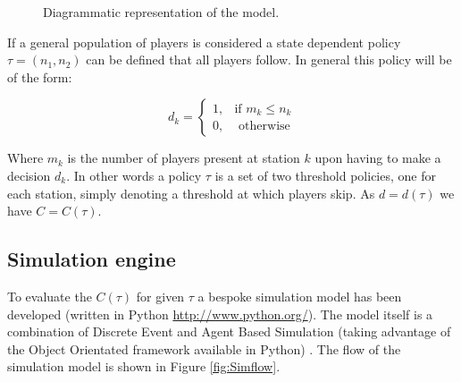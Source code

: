 \documentclass[12pt]{article}
\begin{document}
\begin{figure}[!hpbt]
\begin{center}
    \end{center}

    \caption{Diagrammatic representation of the model.}
	\label{game_pic}

\end{figure}

If a general population of players is considered a state dependent policy $\tau = (n_1, n_2)$ can be defined that all players follow.
In general this policy will be of the form:

$$d_k = \begin{cases}
1,& \text{if }m_k\leq n_k\\
0,&\text{ otherwise}
\end{cases}$$

Where $m_k$ is the number of players present at station $k$ upon having to make a decision $d_k$.
In other words a policy $\tau$ is a set of two threshold policies, one for each station, simply denoting a threshold at which players skip.
As $d=d(\tau)$ we have $C=C(\tau)$.


\subsection{Simulation engine}

To evaluate the $C(\tau)$ for given $\tau$ a bespoke simulation model has been developed  (written in Python \url{http://www.python.org/}).
The model itself is a combination of Discrete Event and Agent Based Simulation (taking advantage of the Object Orientated framework available in Python) \cite{robinson2004simulation}.
The flow of the simulation model is shown in Figure \ref{fig:Simflow}.
\end{document}

